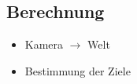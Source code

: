 \subsection{Berechnung}
\begin{itemize}
\item Kamera $\rightarrow$ Welt
\item Bestimmung der Ziele
\end{itemize}